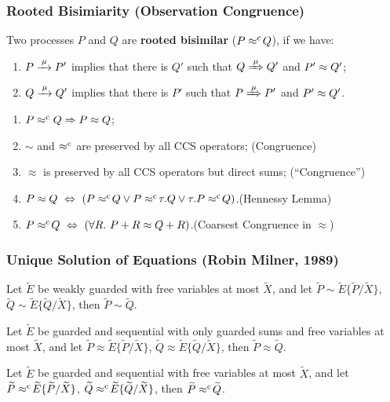\begin{frame}
\frametitle{Rooted Bisimiarity (Observation Congruence)}
\begin{definition}
Two processes $P$ and $Q$ are \textbf{rooted bisimilar} ($P\mathrel{\approx^{\mathrm{c}}}\! Q$), if we have:
\begin{enumerate}
 \item  $P \arr\mu P'$ implies that there is $Q'$ such that $Q
   \Arr\mu Q'$ and $P' \approx Q'$;
 \item  $Q \arr\mu Q'$ implies that there is $P'$ such that $P
   \Arr\mu P'$ and $P' \approx Q'$\enspace.
\end{enumerate}
\end{definition}
\begin{theorem}
\begin{enumerate}
\item $P \mathrel{\approx^{\mathrm{c}}} Q \Rightarrow P \approx Q$;
\item $\sim$ and $\mathrel{\approx^{\mathrm{c}}}$ are preserved by all CCS operators; \hfill
  (Congruence)
\item $\approx$ is preserved by all CCS operators but direct sums;\hfill
  (``Congruence'')
\item $P \approx Q\ \Leftrightarrow\ (P \mathrel{\approx^{\mathrm{c}}}\! Q
  \vee P \mathrel{\approx^{\mathrm{c}}}\! \tau.Q \vee \tau.P \mathrel{\approx^{\mathrm{c}}}\! Q)$.\hfill (Hennessy Lemma)
\item $P \mathrel{\approx^{\mathrm{c}}}\! Q\ \Leftrightarrow\ ( \forall R.\
  P + R \approx Q + R)$.\hfill (Coarsest Congruence in $\approx$)
\end{enumerate}
\end{theorem}
\end{frame}

\begin{frame}
\frametitle{Unique Solution of Equations (Robin Milner, 1989)}
\begin{theorem}
Let $\tilde{E}$ be weakly guarded with free variables at most
$\tilde{X}$, and let $\tilde{P}\sim\tilde{E}\{\tilde{P}/\tilde{X}\}$,
$\tilde{Q}\sim\tilde{E}\{\tilde{Q}/\tilde{X}\}$, then $\tilde{P}\sim\tilde{Q}$.
\end{theorem}

\begin{theorem}
Let $\tilde{E}$ be guarded and sequential with only guarded sums and
free variables at most $\tilde{X}$, and let
$\tilde{P}\approx\tilde{E}\{\tilde{P}/\tilde{X}\}$,
$\tilde{Q}\approx\tilde{E}\{\tilde{Q}/\tilde{X}\}$, then $\tilde{P}\approx\tilde{Q}$.
\end{theorem}

\begin{theorem}
Let $\tilde{E}$ be guarded and sequential with free variables at most
$\tilde{X}$, and let $\widetilde{P}\mathrel{\approx^{\mathrm{c}}}\!\widetilde{E}\{\widetilde{P}/\widetilde{X}\}$,
$\widetilde{Q}\mathrel{\approx^{\mathrm{c}}}\!\widetilde{E}\{\widetilde{Q}/\widetilde{X}\}$, then $\widetilde{P}\mathrel{\approx^{\mathrm{c}}}\!\widetilde{Q}$.
\end{theorem}
\end{frame}

